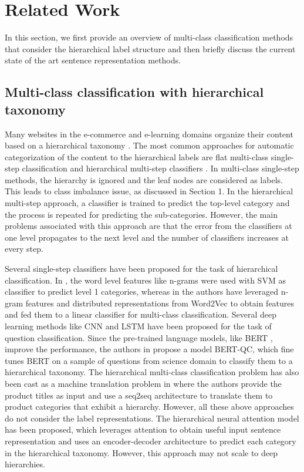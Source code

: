 \documentclass[runningheads, envcountsame, a4paper]{llncs}
\begin{document}
\section{Related Work}


In this section, we first provide an overview of multi-class classification methods that consider the hierarchical label structure and then briefly discuss the current state of the art sentence representation methods.


\setlength{\parindent}{0pt}

\subsection{Multi-class classification with hierarchical taxonomy}
\setlength{\parindent}{0pt}
Many websites in the e-commerce and e-learning domains organize their content based on a hierarchical taxonomy \cite{xumulti,kozareva2015everyone}. The most common approaches for automatic categorization of the content to the hierarchical labels are flat multi-class single-step classification  and hierarchical multi-step classifiers \cite{article,yu2012product}. In multi-class single-step methods, the hierarchy is ignored and the leaf nodes are considered as labels. This leads to class imbalance issue, as discussed in Section 1. In the hierarchical multi-step approach, a classifier is trained to predict the top-level category and the process is repeated for predicting the sub-categories. However, the main problems associated with this approach are that the error from the classifiers at one level propagates to the next level and the number of classifiers increases at every step.

Several single-step classifiers have been proposed for the task of hierarchical classification. In \cite{yu2012product}, the word level features like n-grams were used with SVM as classifier to predict level 1 categories, whereas in \cite{kozareva2015everyone} the authors have leveraged n-gram features and distributed representations from Word2Vec to obtain features and fed them to a linear classifier for multi-class classification. Several deep learning methods like CNN \cite{10.1145/3302425.3302483} and LSTM \cite{article} have been proposed for the task of question classification. Since the pre-trained language models, like BERT \cite{BERT}, improve the performance, the authors in \cite{xumulti} propose a model BERT-QC, which fine tunes BERT on a sample of questions from science domain to classify them to a hierarchical taxonomy. The hierarchical multi-class classification problem has also been cast as a machine translation problem in \cite{MachinT} where the authors provide the product titles as input and use a seq2seq architecture to translate them to product categories that exhibit a hierarchy. However, all these above approaches do not consider the label representations. The hierarchical neural attention model \cite{sinha2018hierarchical} has been proposed, which leverages attention to obtain useful input sentence representation and uses an encoder-decoder architecture to predict each category in the hierarchical taxonomy. However, this approach may not scale to deep hierarchies.
\end{document}
